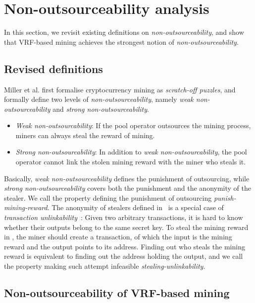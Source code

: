\section{Non-outsourceability analysis}
\label{sec:non_outsourceability}

In this section, we revisit existing definitions on \emph{non-outsourceability}, and show that VRF-based mining achieves the strongest notion of \emph{non-outsourceability}.

\subsection{Revised definitions}

Miller et al. \cite{miller2015nonoutsourceable} first formalise cryptocurrency mining as \emph{scratch-off puzzles}, and formally define two levels of \emph{non-outsourceability}, namely \emph{weak non-outsourceability} and \emph{strong non-outsourceability}.

\begin{itemize}
    \item \emph{Weak non-outsourcability}: If the pool operator outsources the mining process, miners can always steal the reward of mining.
    \item \emph{Strong non-outsourcability}: In addition to \emph{weak non-outsourcability}, the pool operator cannot link the stolen mining reward with the miner who steals it.
\end{itemize}

Basically, \emph{weak non-outsourceability} defines the punishment of outsourcing, while \emph{strong non-outsourceability} covers both the punishment and the anonymity of the stealer.
We call the property defining the punishment of outsourcing \emph{punish-mining-reward}.
The anonymity of stealers defined in~\cite{miller2015nonoutsourceable} is a special case of \emph{transaction unlinkability}~\cite{van2013cryptonote}: Given two arbitrary transactions, it is hard to know whether their outputs belong to the same secret key.
To steal the mining reward in \cite{miller2015nonoutsourceable}, the miner should create a transaction, of which the input is the mining reward and the output points to its address.
Finding out who steals the mining reward is equivalent to finding out the address holding the output, and we call the property making such attempt infeasible \emph{stealing-unlinkability}.




\subsection{Non-outsourceability of VRF-based mining}

